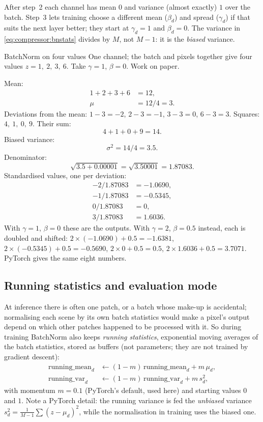 After step~2 each channel has mean $0$ and variance (almost exactly) $1$ over the batch. Step~3 lets
training choose a different mean ($\beta_d$) and spread ($\gamma_d$) if that suits the next layer
better; they start at $\gamma_d = 1$ and $\beta_d = 0$. The variance in \cref{eq:compressor:bnstats}
divides by $M$, not $M-1$: it is the \emph{biased} variance.

\begin{worked}[label={we:compressor:bn}]{BatchNorm on four values}
One channel; the batch and pixels together give four values $z = 1,\ 2,\ 3,\ 6$. Take $\gamma = 1$,
$\beta = 0$. Work on paper.

Mean:
\begin{align*}
1 + 2 + 3 + 6 &= 12,\\
\mu &= 12/4 = 3.
\end{align*}
Deviations from the mean: $1-3 = -2$, $2-3 = -1$, $3-3 = 0$, $6-3 = 3$.
Squares: $4,\ 1,\ 0,\ 9$. Their sum:
\[
4 + 1 + 0 + 9 = 14.
\]
Biased variance:
\[
\sigma^2 = 14/4 = 3.5.
\]
Denominator:
\[
\sqrt{3.5 + 0.00001} = \sqrt{3.50001} = 1.87083.
\]
Standardised values, one per deviation:
\begin{align*}
-2 / 1.87083 &= -1.0690,\\
-1 / 1.87083 &= -0.5345,\\
0 / 1.87083 &= 0,\\
3 / 1.87083 &= 1.6036.
\end{align*}
With $\gamma=1$, $\beta=0$ these are the outputs. With $\gamma = 2$, $\beta = 0.5$ instead, each is
doubled and shifted: $2\times(-1.0690) + 0.5 = -1.6381$, $2\times(-0.5345)+0.5 = -0.5690$,
$2\times0+0.5 = 0.5$, $2\times1.6036 + 0.5 = 3.7071$. PyTorch gives the same eight numbers\tagC.
\end{worked}

\subsection{Running statistics and evaluation mode}

At inference there is often one patch, or a batch whose make-up is accidental; normalising each scene by
its own batch statistics would make a pixel's output depend on which other patches happened to be
processed with it. So during training BatchNorm also keeps \emph{running statistics}, exponential moving averages of the batch statistics, stored as buffers (not parameters;
they are not trained by gradient descent):
\begin{align}
\text{running\_mean}_d &\leftarrow (1-m)\,\text{running\_mean}_d + m\,\mu_d,\label{eq:compressor:rm}\\
\text{running\_var}_d &\leftarrow (1-m)\,\text{running\_var}_d + m\,s_d^2,\label{eq:compressor:rv}
\end{align}
with momentum $m = 0.1$ (PyTorch's default, used here) and starting values $0$ and $1$. Note a
PyTorch detail: the running variance is fed the \emph{unbiased} variance
$s_d^2 = \frac{1}{M-1}\sum(z-\mu_d)^2$, while the normalisation in training uses the biased one.

